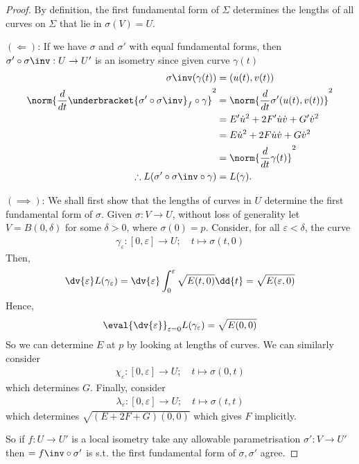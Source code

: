 \begin{proof}
	By definition, the first fundamental form of $\Sigma$ determines the lengths of all curves on $\Sigma$ that lie in $\sigma(V) = U$.

	$(\Longleftarrow)$: If we have $\sigma$ and $\sigma'$ with equal fundamental forms, then $\sigma' \circ \sigma\inv : U \to U'$ is an isometry since given curve $\gamma(t)$
	\begin{align*}
		\sigma\inv(\gamma(t)) &= (u(t), v(t)) \\
		\norm{\frac{d}{dt} \underbracket{\sigma' \circ \sigma\inv}_f \circ \gamma}^2 &= \norm{\frac{d}{dt} \sigma'(u(t), v(t))}^2 \\
		&= E' \dot{u}^2 + 2 F' \dot{u} \dot{v} + G' \dot{v}^2 \\
		&= E \dot{u}^2 + 2 F \dot{u} \dot{v} + G \dot{v}^2 \\
		&= \norm{\frac{d}{dt} \gamma(t)}^2 \\
		\therefore L(\sigma' \circ \sigma\inv \circ \gamma) &= L(\gamma).
	\end{align*} 

	$(\implies)$: We shall first show that the lengths of curves in $U$ determine the first fundamental form of $\sigma$.
	Given $\sigma \colon V \to U$, without loss of generality let $V = B(0,\delta)$ for some $\delta > 0$, where $\sigma(0) = p$.
	Consider, for all $\varepsilon < \delta$, the curve
	\begin{align*}
		\gamma_\varepsilon \colon [0,\varepsilon] \to U;\quad t \mapsto \sigma(t,0)
	\end{align*}
	Then,
	\begin{align*}
		\dv{\varepsilon} L(\gamma_\varepsilon) = \dv{\varepsilon} \int_0^\varepsilon \sqrt{E(t,0)} \dd{t} = \sqrt{E(\varepsilon,0)}
	\end{align*}
	Hence,
	\begin{align*}
		\eval{\dv{\varepsilon}}_{\varepsilon = 0} L(\gamma_\varepsilon) = \sqrt{E(0,0)}
	\end{align*}
	So we can determine $E$ at $p$ by looking at lengths of curves.
	We can similarly consider
	\begin{align*}
		\chi_\varepsilon \colon [0,\varepsilon] \to U;\quad t \mapsto \sigma(0,t)
	\end{align*}
	which determines $G$.
	Finally, consider
	\begin{align*}
		\lambda_\varepsilon \colon [0,\varepsilon] \to U;\quad t \mapsto \sigma(t,t)
	\end{align*}
	which determines $\sqrt{(E+2F+G)(0,0)}$ which gives $F$ implicitly.

	So if $f: U \to U'$ is a local isometry take any allowable parametrisation $\sigma' : V \to U'$ then $ = f\inv \circ \sigma'$ is s.t. the first fundamental form of $\sigma, \sigma'$ agree.
\end{proof}

